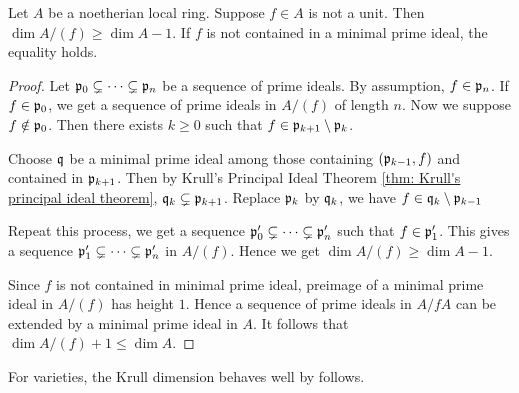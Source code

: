     \begin{corollary}\label{cor: geometric form of principal ideal theorem}
        Let $A$ be a noetherian local ring.
        Suppose $f \in A$ is not a unit.
        Then $\dim A/(f) \geq \dim A - 1$.
        If $f$ is not contained in a minimal prime ideal, the equality holds.
    \end{corollary}
    \begin{proof}
        Let ${\mathfrak{p}}_0 \subsetneq \cdots \subsetneq {\mathfrak{p}}_n$ be a sequence of prime ideals.
        By assumption, $f \in {\mathfrak{p}}_n$.
        If $f \in {\mathfrak{p}}_0$, we get a sequence of prime ideals in $A/(f)$ of length $n$.
        Now we suppose $f \notin {\mathfrak{p}}_0$.
        Then there exists $k \geq 0$ such that $f \in {\mathfrak{p}}_{k+1} \setminus {\mathfrak{p}}_{k}$. 
            
        Choose ${\mathfrak{q}}$ be a minimal prime ideal among those containing $({\mathfrak{p}}_{k-1},f)$ and contained in ${\mathfrak{p}}_{k+1}$.
        Then by Krull's Principal Ideal Theorem \ref{thm: Krull's principal ideal theorem}, ${\mathfrak{q}}_k \subsetneq {\mathfrak{p}}_{k+1}$.
        Replace ${\mathfrak{p}}_k$ by ${\mathfrak{q}}_k$, we have $f \in {\mathfrak{q}}_{k} \setminus {\mathfrak{p}}_{k-1}$

        Repeat this process, we get a sequence ${\mathfrak{p}}_0' \subsetneq \cdots \subsetneq {\mathfrak{p}}_n'$ such that $f \in {\mathfrak{p}}_1'$.
        This gives a sequence ${\mathfrak{p}}_1' \subsetneq \cdots \subsetneq {\mathfrak{p}}_n'$ in $A/(f)$.
        Hence we get $\dim A/(f) \geq \dim A - 1$.
 
        Since $f$ is not contained in minimal prime ideal, preimage of a minimal prime ideal in $A/(f)$ has height $1$.
        Hence a sequence of prime ideals in $A/fA$ can be extended by a minimal prime ideal in $A$.
        It follows that $\dim A/(f) + 1 \leq \dim A$.
    \end{proof}

    For varieties, the Krull dimension behaves well by follows.

